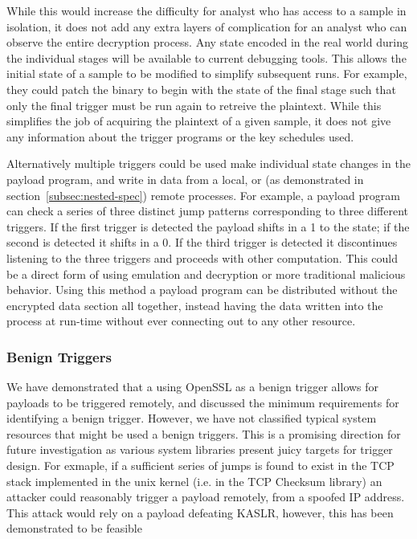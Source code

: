 While this would increase the difficulty for analyst  who has access
to a sample in isolation, it  does not add any extra layers of complication 
for an analyst who can observe the entire decryption process. Any state 
encoded in the real world during the individual stages will be available to current 
debugging tools. This allows the initial state of a sample to be modified
to simplify subsequent runs. For example, they could patch the 
binary to begin with the state of the final stage such that only the final 
trigger must be run again to retreive the plaintext. While this simplifies the 
job of acquiring the plaintext of a given \speculake sample, it does not give any 
information about the trigger programs or the key schedules used. 

\smallskip

Alternatively multiple triggers could be used make individual state changes in
the payload program, and write in data from a local, or (as demonstrated in 
section~\ref{subsec:nested-spec}) remote processes. For example, a payload program
can check a series of three distinct jump patterns corresponding to three different 
triggers. If the first trigger is detected the payload shifts in a 1 to the state; if
the second is detected it shifts in a 0. If the third trigger is detected it 
discontinues listening to the three triggers and proceeds with other computation. 
This could be a direct form of \speculake using emulation and decryption 
or more traditional malicious behavior. Using this method a payload program can
be distributed without the encrypted data section all together, instead having 
the data written into the process at run-time without ever connecting out to any 
other resource. 

\subsubsection{Benign Triggers}
We have demonstrated that a using OpenSSL as a benign trigger allows for 
\speculake payloads to be triggered remotely, and discussed the minimum 
requirements for identifying a benign trigger. However, we have not classified
typical system resources that might be used a benign triggers. This is a 
promising direction for future investigation as various system libraries present 
juicy targets for trigger design. For exmaple, if a sufficient series of jumps 
is found to exist in the TCP stack implemented in the unix kernel (i.e. in the TCP
Checksum library) an attacker could reasonably trigger a \speculake payload remotely,
from a spoofed IP address. This attack would rely on a payload defeating KASLR, 
however, this has been demonstrated to be feasible~\cite{gruss2017kaslr,evtyushkin2016jump}

